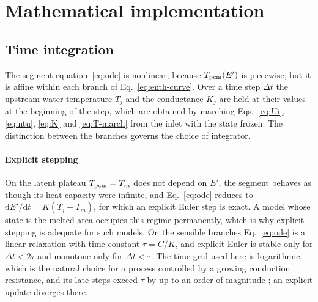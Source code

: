 \section{Mathematical implementation}
\label{sec:implementation}

\subsection{Time integration}
\label{sec:integration}

The segment equation~\eqref{eq:ode} is nonlinear, because $T_{\mathrm{pcm}}(E')$ is
piecewise, but it is affine within each branch of
Eq.~\eqref{eq:enth-curve}. Over a time step $\Delta t$ the upstream water
temperature $T_j$ and the conductance $K_j$ are held at their values at the
beginning of the step, which are obtained by marching
Eqs.~\eqref{eq:Ui}, \eqref{eq:ntu}, \eqref{eq:K} and \eqref{eq:T-march} from
the inlet with the state frozen. The distinction between the branches governs
the choice of integrator.

\paragraph{Explicit stepping} On the latent plateau $T_{\mathrm{pcm}}=T_m$ does not depend
on $E'$, the segment behaves as though its heat capacity were infinite, and
Eq.~\eqref{eq:ode} reduces to $\mathrm{d}E'/\mathrm{d}t=K(T_j-T_m)$, for which
an explicit Euler step is exact. A model whose state is the melted area
occupies this regime permanently, which is why explicit stepping is adequate
for such models. On the sensible branches Eq.~\eqref{eq:ode} is a linear
relaxation with time constant $\tau=C/K$, and explicit Euler is stable only
for $\Delta t<2\tau$ and monotone only for $\Delta t<\tau$. The time grid
used here is logarithmic, which is the natural choice for a process
controlled by a growing conduction resistance, and its late steps exceed
$\tau$ by up to an order of magnitude ; an explicit
update diverges there.


